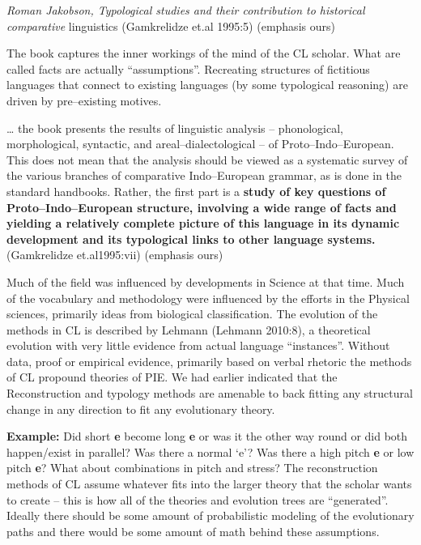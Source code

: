 \begin{myquote}
\textit{Roman Jakobson, Typological studies and their contribution to historical comparative} linguistics (Gamkrelidze et.al 1995:5) (emphasis ours)
\end{myquote}

The book captures the inner workings of the mind of the CL scholar. What are called facts are actually “assumptions”. Recreating structures of fictitious languages that connect to existing languages (by some typological reasoning) are driven by pre–existing motives.

\begin{myquote}
… the book presents the results of linguistic analysis – phonological, morphological, syntactic, and areal–dialectological – of Proto–Indo–European. This does not mean that the analysis should be viewed as a systematic survey of the various branches of comparative Indo–European grammar, as is done in the standard handbooks. Rather, the first part is a \textbf{study of key questions of Proto–Indo–European structure, involving a wide range of facts and yielding a relatively complete picture of this language in its dynamic development and its typological links to other language systems.} (Gamkrelidze et.al1995:vii) (emphasis ours)
\end{myquote}

Much of the field was influenced by developments in Science at that time. Much of the vocabulary and methodology were influenced by the efforts in the Physical sciences, primarily ideas from biological classification. The evolution of the methods in CL is described by Lehmann (Lehmann 2010:8), a theoretical evolution with very little evidence from actual language “instances”. Without data, proof or empirical evidence, primarily based on verbal rhetoric the methods of CL propound theories of PIE. We had earlier indicated that the Reconstruction and typology methods are amenable to back fitting any structural change in any direction to fit any evolutionary theory.

\textbf{Example:} Did short \textbf{e} become long \textbf{e} or was it the other way round or did both happen/exist in parallel? Was there a normal ‘e’? Was there a high pitch \textbf{e} or low pitch \textbf{e}? What about combinations in pitch and stress? The reconstruction methods of CL assume whatever fits into the larger theory that the scholar wants to create – this is how all of the theories and evolution trees are “generated”. Ideally there should be some amount of probabilistic modeling of the evolutionary paths and there would be some amount of math behind these assumptions.

